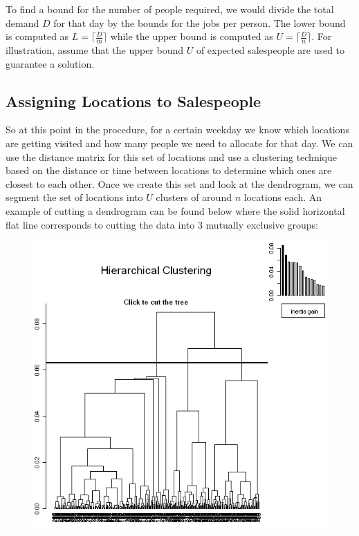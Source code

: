 \documentclass{article}
\begin{document}
To find a bound for the number of people required, we would divide the total demand $D$ for that day by the bounds for the jobs per person.  The lower bound is computed as $L=\lceil\frac{D}{m}\rceil$ while the upper bound is computed as $U=\lceil\frac{D}{n}\rceil$.  For illustration, assume that the upper bound $U$ of expected salespeople are used to guarantee a solution.\\

\subsection{Assigning Locations to Salespeople}
So at this point in the procedure, for a certain weekday we know which locations are getting visited and how many people we need to allocate for that day.  We can use the distance matrix for this set of locations and use a clustering technique based on the distance or time between locations to determine which ones are closest to each other.  Once we create this set and look at the dendrogram, we can segment the set of locations into $U$ clusters of around $n$ locations each.  An example of cutting a dendrogram can be found below where the solid horizontal flat line corresponds to cutting the data into 3 mutually exclusive groups: \\

\begin{figure}[H]
	\centering
	\includegraphics[scale=0.50]{hierarchical_clustering_example}
	\label{fig:Hierarchical Clustering Dendrogram Example}
\end{figure}
\end{document}

